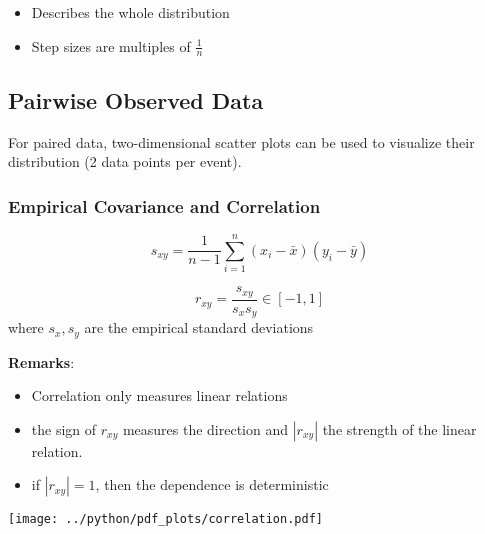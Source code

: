 \begin{itemize}
    \item Describes the whole distribution
    \item Step sizes are multiples of $\frac{1}{n}$
\end{itemize}

\subsection{Pairwise Observed Data}
For paired data, two-dimensional scatter plots can be used to visualize their distribution (2 data points per event).

\subsubsection{Empirical Covariance and Correlation}

\noindent\begin{equation*}
    s_{xy}=\frac{1}{n-1}\sum_{i=1}^n(x_i-\bar{x})(y_i-\bar{y})
\end{equation*}


\noindent\begin{equation*}
    r_{xy}=\frac{s_{xy}}{s_x s_y}\in[-1,1]
\end{equation*}
where $s_x,s_y$ are the empirical standard deviations\

\textbf{Remarks}:
\begin{itemize}
    \item Correlation only measures linear relations
    \item the sign of $r_{xy}$ measures the direction and $|r_{xy}|$ the strength of the linear relation.
    \item if $|r_{xy}|=1$, then the dependence is deterministic
\end{itemize}
\begin{center}
    \texttt{[image: ../python/pdf\_plots/correlation.pdf]}
\end{center}